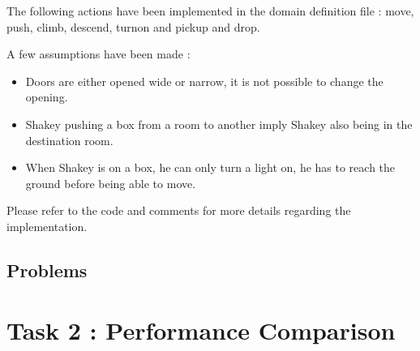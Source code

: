 The following actions have been implemented in the domain definition file :
move, push, climb, descend, turnon and pickup and drop.

A few assumptions have been made :
\begin{itemize}
  \item Doors are either opened wide or narrow, it is not possible to change the
opening.
  \item Shakey pushing a box from a room to another imply Shakey also being in
the destination room.
  \item When Shakey is on a box, he can only turn a light on, he has to reach
the ground before being able to move.
\end{itemize}

Please refer to the code and comments for more details regarding the
implementation.

\newpage
\thispagestyle{empty}
\subsection*{Problems}
\newpage
\section*{Task 2 : Performance Comparison}
\thispagestyle{empty}

